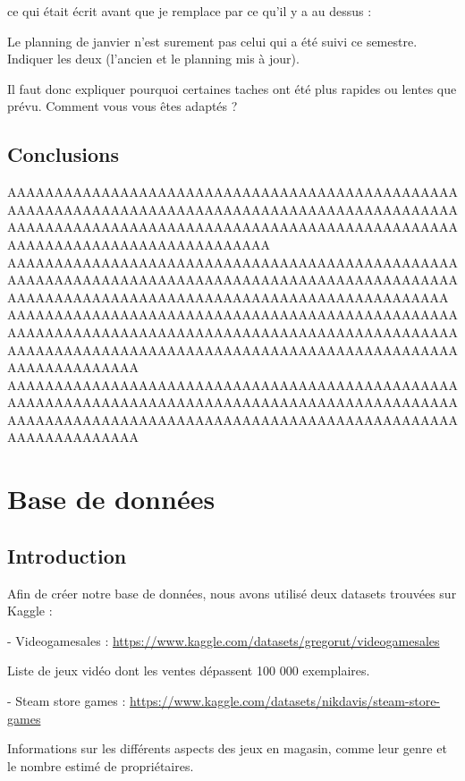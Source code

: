 \documentclass[mstat,12pt]{unswthesis}
\begin{document}
ce qui était écrit avant que je remplace par ce qu'il y a au dessus :

Le planning de janvier n’est surement pas celui qui a été suivi ce semestre. Indiquer les deux (l’ancien et le planning mis à jour).

Il faut donc expliquer pourquoi certaines taches ont été plus rapides ou lentes que prévu.  Comment vous vous êtes adaptés ? 


\hypertarget{ConclusionGestionProjet}{%
\section{Conclusions}\label{ConcluGestionProjet}}

AAAAAAAAAAAAAAAAAAAAAAAAAAAAAAAAAAAAAAAAAAAAAAAAAAAAAAAAAAAAAAAAAAAAAAAAAAAAAAAAAAAAAAAAAAAAAAAAAAAAAAAAAAAAAAAAAAAAAAAAAAAAAAAAAAAAAAAAAAAAAAAAAAAAAAAAAAAAAAAAAAAAAAAAAAAA
AAAAAAAAAAAAAAAAAAAAAAAAAAAAAAAAAAAAAAAAAAAAAAAAAAAAAAAAAAAAAAAAAAAAAAAAAAAAAAAAAAAAAAAAAAAAAAAAAAAAAAAAAAAAAAAAAAAAAAAAAAAAAAAAAAAAAAAAAAAAAAA
AAAAAAAAAAAAAAAAAAAAAAAAAAAAAAAAAAAAAAAAAAAAAAAAAAAAAAAAAAAAAAAAAAAAAAAAAAAAAAAAAAAAAAAAAAAAAAAAAAAAAAAAAAAAAAAAAAAAAAAAAAAAAAAAAAAAAAAAAAAAAAAAAAAAAAAAAAAAAA
AAAAAAAAAAAAAAAAAAAAAAAAAAAAAAAAAAAAAAAAAAAAAAAAAAAAAAAAAAAAAAAAAAAAAAAAAAAAAAAAAAAAAAAAAAAAAAAAAAAAAAAAAAAAAAAAAAAAAAAAAAAAAAAAAAAAAAAAAAAAAAAAAAAAAAAAAAAAAA


\hypertarget{BD}{%
\chapter{Base de données}\label{chapBD}}


\hypertarget{IntroductionBD}{%
\section{Introduction}\label{IntroBD}}

Afin de créer notre base de données, nous avons utilisé deux datasets trouvées sur Kaggle :

- Videogamesales : \url{https://www.kaggle.com/datasets/gregorut/videogamesales}

Liste de jeux vidéo dont les ventes dépassent 100 000 exemplaires.

- Steam store games : \url{https://www.kaggle.com/datasets/nikdavis/steam-store-games}


Informations sur les différents aspects des jeux en magasin, comme leur genre et le nombre estimé de propriétaires. \\
\end{document}
